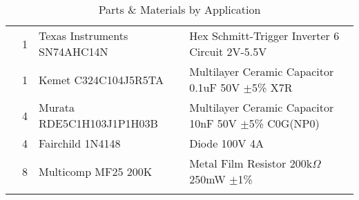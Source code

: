 \begin{longtabu}{X[3,c,m] X[1,c,m] X[3,c,m] X[5,l,m]}
   & 1 & Texas Instruments SN74AHC14N & Hex Schmitt-Trigger Inverter 6 Circuit 2V-5.5V \\
  & 1 & Kemet C324C104J5R5TA & Multilayer Ceramic Capacitor 0.1uF 50V $\pm$5\% X7R \\
  & 4 & Murata RDE5C1H103J1P1H03B & Multilayer Ceramic Capacitor 10nF 50V $\pm$5\% C0G(NP0) \\
  & 4 & Fairchild 1N4148 & Diode 100V 4A \\
  & 8 & Multicomp MF25 200K & Metal Film Resistor 200k$\Omega$ 250mW $\pm$1\% \\

  \bhrule
\caption{Parts \& Materials by Application}
\end{longtabu}

